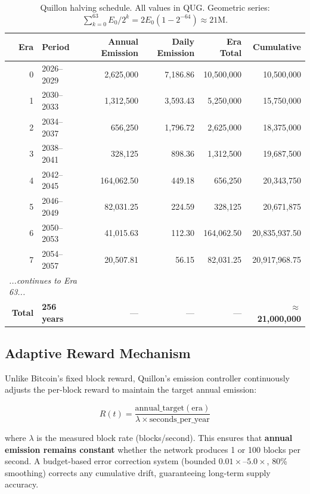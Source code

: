 \documentclass[11pt,a4paper]{article}
\begin{document}
\begin{table}[H]
\centering
\small
\begin{tabular}{r l r r r r}
\toprule
\textbf{Era} & \textbf{Period} & \textbf{Annual Emission} & \textbf{Daily Emission} & \textbf{Era Total} & \textbf{Cumulative} \\
\midrule
\rowcolor{qred!8} 0 & 2026--2029 & 2,625,000 & 7,186.86 & 10,500,000 & 10,500,000 \\
\rowcolor{qorange!8} 1 & 2030--2033 & 1,312,500 & 3,593.43 & 5,250,000 & 15,750,000 \\
\rowcolor{qgold!8} 2 & 2034--2037 & 656,250 & 1,796.72 & 2,625,000 & 18,375,000 \\
3 & 2038--2041 & 328,125 & 898.36 & 1,312,500 & 19,687,500 \\
4 & 2042--2045 & 164,062.50 & 449.18 & 656,250 & 20,343,750 \\
5 & 2046--2049 & 82,031.25 & 224.59 & 328,125 & 20,671,875 \\
6 & 2050--2053 & 41,015.63 & 112.30 & 164,062.50 & 20,835,937.50 \\
7 & 2054--2057 & 20,507.81 & 56.15 & 82,031.25 & 20,917,968.75 \\
\midrule
\multicolumn{2}{l}{\textit{...continues to Era 63...}} & & & & \\
\midrule
\textbf{Total} & \textbf{256 years} & --- & --- & --- & \textbf{$\approx$21,000,000} \\
\bottomrule
\end{tabular}
\caption{Quillon halving schedule. All values in QUG. Geometric series: $\sum_{k=0}^{63} E_0/2^k = 2E_0(1-2^{-64}) \approx 21\text{M}$.}
\end{table}

\subsection{Adaptive Reward Mechanism}

Unlike Bitcoin's fixed block reward, Quillon's emission controller continuously adjusts the per-block reward to maintain the target annual emission:

\begin{equation}
R(t) = \frac{\text{annual\_target}(\text{era})}{\lambda \times \text{seconds\_per\_year}}
\end{equation}

where $\lambda$ is the measured block rate (blocks/second). This ensures that \textbf{annual emission remains constant} whether the network produces 1 or 100 blocks per second. A budget-based error correction system (bounded $0.01\times$--$5.0\times$, 80\% smoothing) corrects any cumulative drift, guaranteeing long-term supply accuracy.
\end{document}

